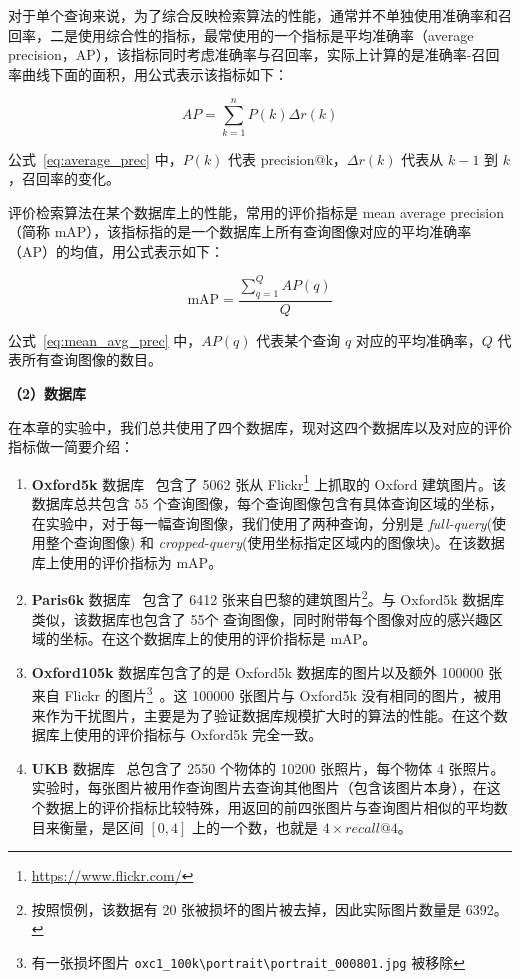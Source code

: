 对于单个查询来说，为了综合反映检索算法的性能，通常并不单独使用准确率和召回率，二是使用综合性的指标，最常使用的一个指标是平均准确率（average precision，AP），该指标同时考虑准确率与召回率，实际上计算的是准确率-召回率曲线下面的面积，用公式表示该指标如下：

\begin{equation}\label{eq:average_prec}
AP = \sum_{k=1}^{n}P(k)\Delta r(k)
\end{equation}

公式~\ref{eq:average_prec} 中，$P(k)$ 代表 precision@k，$\Delta r(k)$ 代表从 $k-1$ 到 $k$，召回率的变化。

评价检索算法在某个数据库上的性能，常用的评价指标是 mean average precision（简称 mAP），该指标指的是一个数据库上所有查询图像对应的平均准确率（AP）的均值，用公式表示如下：

\begin{equation}\label{eq:mean_avg_prec}
\text{mAP} = \frac{\sum_{q=1}^{Q}AP(q)}{Q}
\end{equation}

公式~\ref{eq:mean_avg_prec} 中，$AP(q)$ 代表某个查询 $q$ 对应的平均准确率，$Q$ 代表所有查询图像的数目。

\noindent\textbf{（2）数据库}

在本章的实验中，我们总共使用了四个数据库，现对这四个数据库以及对应的评价指标做一简要介绍：
\begin{enumerate}
\item \textbf{Oxford5k} 数据库~\cite{Philbin2007ObjectRW} 包含了 5062 张从 Flickr\footnote{\url{https://www.flickr.com/}} 上抓取的 Oxford 建筑图片。该数据库总共包含 55 个查询图像，每个查询图像包含有具体查询区域的坐标，在实验中，对于每一幅查询图像，我们使用了两种查询，分别是 \emph{full-query}(使用整个查询图像) 和 \emph{cropped-query}(使用坐标指定区域内的图像块)。在该数据库上使用的评价指标为 mAP。


\item \textbf{Paris6k} 数据库~\cite{Philbin2008LostIQ} 包含了 6412 张来自巴黎的建筑图片\footnote{按照惯例，该数据有 20 张被损坏的图片被去掉，因此实际图片数量是 6392。}。与 Oxford5k 数据库类似，该数据库也包含了 55个 查询图像，同时附带每个图像对应的感兴趣区域的坐标。在这个数据库上的使用的评价指标是 mAP。

\item \textbf{Oxford105k} 数据库包含了的是 Oxford5k 数据库的图片以及额外 100000 张来自 Flickr 的图片\footnote{有一张损坏图片 \verb+oxc1_100k\portrait\portrait_000801.jpg+ 被移除}~\cite{Philbin2007ObjectRW}。这 100000 张图片与 Oxford5k 没有相同的图片，被用来作为干扰图片，主要是为了验证数据库规模扩大时的算法的性能。在这个数据库上使用的评价指标与 Oxford5k 完全一致。

\item  \textbf{UKB} 数据库~\cite{Nistr2006ScalableRW} 总包含了 2550 个物体的 10200 张照片，每个物体 4 张照片。实验时，每张图片被用作查询图片去查询其他图片（包含该图片本身），在这个数据上的评价指标比较特殊，用返回的前四张图片与查询图片相似的平均数目来衡量，是区间 $[0,4]$ 上的一个数，也就是 $4\times recall@4$。

\end{enumerate}

